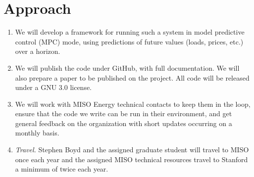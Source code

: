 \documentclass[12pt]{article}
\begin{document}
\section{Approach}

\begin{enumerate}
\item 
We will develop a framework for running such a system in model predictive control (MPC)
mode, using predictions of future values (loads, prices, etc.) over a horizon.

\item
We will publish the code under GitHub,
with full documentation. We will also prepare a paper to be published on the project.
All code will be released under a GNU 3.0 license.

\item 
We will work with MISO Energy technical contacts to keep them in the loop,
ensure that the code we write can be run in their environment,
and get general feedback on the organization with short updates
occurring on a monthly basis.

\item \emph{Travel.} 
Stephen Boyd and the assigned graduate student
will travel to MISO once each year and the assigned MISO technical 
resources travel to Stanford a minimum of twice each year.

%
\end{enumerate}


\end{document}

